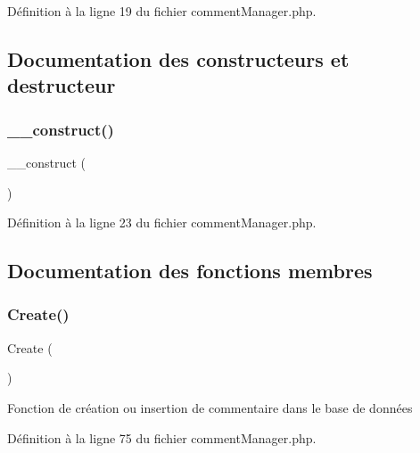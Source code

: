 Définition à la ligne 19 du fichier comment\+Manager.\+php.



\subsection{Documentation des constructeurs et destructeur}
\mbox{\label{class_src_1_1_managers_1_1comment_manager_a095c5d389db211932136b53f25f39685}} 
\subsubsection{\texorpdfstring{\+\_\+\+\_\+construct()}{\_\_construct()}}
{\footnotesize\ttfamily \+\_\+\+\_\+construct (\begin{DoxyParamCaption}{ }\end{DoxyParamCaption})}



Définition à la ligne 23 du fichier comment\+Manager.\+php.



\subsection{Documentation des fonctions membres}
\mbox{\label{class_src_1_1_managers_1_1comment_manager_ad01f71fa0ecc039494e3c282864298c3}} 
\subsubsection{\texorpdfstring{Create()}{Create()}}
{\footnotesize\ttfamily Create (\begin{DoxyParamCaption}{ }\end{DoxyParamCaption})}

Fonction de création ou insertion de commentaire dans le base de données 

Définition à la ligne 75 du fichier comment\+Manager.\+php.

